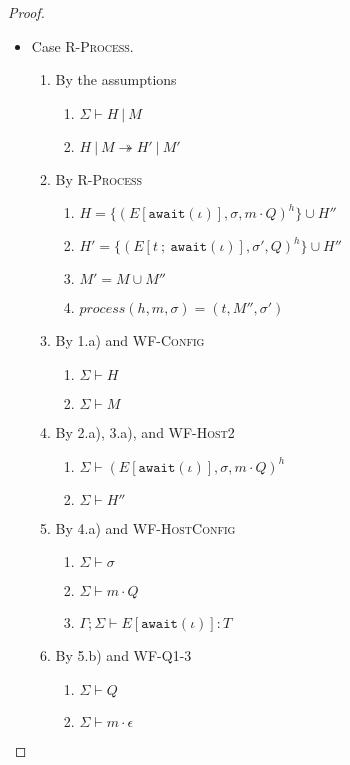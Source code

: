 \begin{proof}
\begin{itemize}
\item Case \textsc{R-Process}.
\begin{enumerate}
\item By the assumptions
  \begin{enumerate}[label=(\alph*)]
  \item $\Sigma \vdash H~|~M$
  \item $H~|~M \twoheadrightarrow H'~|~M'$
  \end{enumerate}
\item By \textsc{R-Process}
  \begin{enumerate}[label=(\alph*)]
  \item $H  = \{ (E[\texttt{await}(\iota)], \sigma, m \cdot Q)^h \} \cup H''$
  \item $H' = \{ (E[t~;~\texttt{await}(\iota)], \sigma', Q)^h \} \cup H''$
  \item $M' = M \cup M''$
  \item $process(h, m, \sigma) = (t, M'', \sigma')$
  \end{enumerate}
\item By 1.a) and \textsc{WF-Config}
  \begin{enumerate}[label=(\alph*)]
  \item $\Sigma \vdash H$
  \item $\Sigma \vdash M$
  \end{enumerate}
\item By 2.a), 3.a), and \textsc{WF-Host2}
  \begin{enumerate}[label=(\alph*)]
  \item $\Sigma \vdash (E[\texttt{await}(\iota)], \sigma, m \cdot Q)^h$
  \item $\Sigma \vdash H''$
  \end{enumerate}
\item By 4.a) and \textsc{WF-HostConfig}
  \begin{enumerate}[label=(\alph*)]
  \item $\Sigma \vdash \sigma$
  \item $\Sigma \vdash m \cdot Q$
  \item $\Gamma ; \Sigma \vdash E[\texttt{await}(\iota)] : T$
  \end{enumerate}
\item By 5.b) and \textsc{WF-Q1-3}
  \begin{enumerate}[label=(\alph*)]
  \item $\Sigma \vdash Q$
  \item $\Sigma \vdash m \cdot \epsilon$

\end{enumerate}
\end{enumerate}
\end{itemize}
\end{proof}

